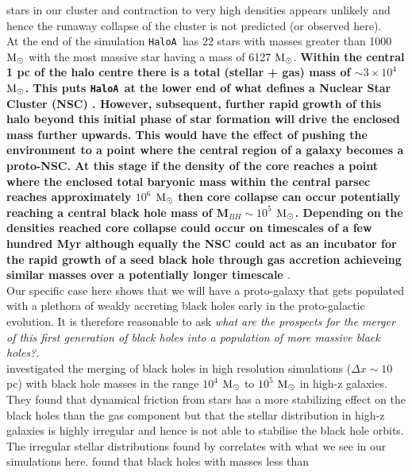 \documentclass[twocolumn,iop,revtex4]{openjournal}
\newcommand{\msolar} {$\rm{M_{\odot}}~$}
\newcommand{\msolarc} {$\rm{M_{\odot}}$}
\newcommand{\ha} {\texttt{HaloA~}}
\begin{document}
stars in our cluster and contraction to very high densities appears unlikely and hence the
runaway collapse of the cluster is not predicted (or observed here). \\
\indent 
At the end of the simulation \ha has 22 stars with masses greater than 1000 \msolar with
the most massive star having a mass of 6127 \msolarc. \textbf{Within the central 1 pc of the 
  halo centre there is a total (stellar + gas) mass of $\sim 3 \times 10^4$ \msolarc.
  This puts \ha at the lower end of what defines a Nuclear Star Cluster (NSC) \citep[e.g.][]{Georgiev_2016}.
  However, subsequent, further rapid growth of this halo beyond this initial phase of star formation
  will drive the enclosed mass further upwards. This would have the effect of pushing the environment
  to a point where the central region of a galaxy becomes a proto-NSC. At this stage if the density
  of the core reaches a point where the enclosed total baryonic mass within the central parsec
  reaches approximately $10^6$ \msolar then core collapse can occur \citep{Davies_2011}
  potentially reaching a central black hole mass of M$_{BH} \sim 10^5$ \msolarc. Depending on the
  densities reached core collapse could occur on timescales of a few hundred Myr
  \citep{Davies_2011} although equally the NSC 
  could act as an incubator for the rapid growth of a seed black hole
  through gas accretion achieveing
similar masses over a potentially longer timescale \citep{Natarajan_2020}}. \\
\indent Our specific case here shows that we will have a  proto-galaxy that gets populated with a plethora of
weakly accreting black holes early in the proto-galactic evolution. It is therefore reasonable to ask \textit{what are the prospects for the merger of this first generation
  of black holes into a population of more massive black holes?}. \\
\indent \cite{Pfister_2019} investigated the merging of black holes in high resolution
simulations ($\Delta x \sim 10$ pc) with black hole masses in the range
$10^4$ \msolar to $10^5$ \msolar in high-z galaxies. They found that dynamical friction from stars
has a more stabilizing effect on the black holes than the gas component but that the stellar
distribution in high-z galaxies is highly irregular and hence is not able to stabilise the black
hole orbits.
The irregular stellar distributions found by \cite{Pfister_2019} correlates with what
we see in our simulations here. \cite{Pfister_2019} found that black holes with masses less than
\end{document}
